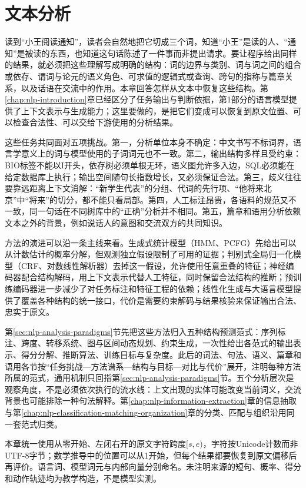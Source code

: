 \chapter{文本分析}
\label{chap:nlp-text-analysis}

读到“小王阅读通知”，读者会自然地把它切成三个词，知道“小王”是读的人、“通知”是被读的东西，也知道这句话陈述了一件事而非提出请求。要让程序给出同样的结果，就必须把这些理解写成明确的结构：词的边界与类别、词与词之间的组合或依存、谓词与论元的语义角色、可求值的逻辑式或查询、跨句的指称与篇章关系，以及话语在交流中的作用。本章回答怎样从文本中恢复这些结构。第\ref{chap:nlp-introduction}章已经区分了任务输出与判断依据，第1部分的语言模型提供了上下文表示与生成能力；这里要做的，是把它们变成可以恢复到原文位置、可以检查合法性、可以交给下游使用的分析结果。

这些任务共同面对五项挑战。第一，分析单位本身不确定：中文书写不标词界，语言学意义上的词与模型使用的子词词元也不一致。第二，输出结构多样且受约束：BIO标签不能以I开头，依存树必须单根无环，语义图允许多入边，SQL必须能在给定数据库上执行；输出空间随句长指数增长，又必须保证合法。第三，歧义往往要靠远距离上下文消解：“新学生代表”的分组、代词的先行项、“他将来北京”中“将来”的切分，都不能只看局部。第四，人工标注昂贵，各语料的规范又不一致，同一句话在不同树库中的“正确”分析并不相同。第五，篇章和语用分析依赖文本之外的背景，例如说话人的意图和交流双方的共同知识。

方法的演进可以沿一条主线来看。生成式统计模型（HMM、PCFG）先给出可以从计数估计的概率分解，但观测独立假设限制了可用的证据；判别式全局归一化模型（CRF、对数线性解析器）去掉这一假设，允许使用任意重叠的特征；神经编码器配合结构解码，用上下文表示代替人工特征，同时保留合法结构的推断；预训练编码器进一步减少了对任务标注和特征工程的依赖；线性化生成与大语言模型提供了覆盖各种结构的统一接口，代价是需要约束解码与结果核验来保证输出合法、忠实于原文。

第\ref{sec:nlp-analysis-paradigms}节先把这些方法归入五种结构预测范式：序列标注、跨度、转移系统、图与区间动态规划、约束生成，一次性给出各范式的输出表示、得分分解、推断算法、训练目标与复杂度。此后的词法、句法、语义、篇章和语用各节按“任务挑战—方法谱系—结构与目标—对比与代价”展开，注明每种方法所属的范式，通用机制只回指第\ref{sec:nlp-analysis-paradigms}节。五个分析层次是观察角度，不是必须依次执行的流水线：上文出现的实体可能改变当前词义，交流背景也可能排除一种句法解释。第\ref{chap:nlp-information-extraction}章的信息抽取与第\ref{chap:nlp-classification-matching-organization}章的分类、匹配与组织沿用同一套范式归类。

本章统一使用从零开始、左闭右开的原文字符跨度$[s,e)$，字符按Unicode计数而非UTF-8字节；数学推导中的位置可以从1开始，但每个结果都要恢复到原文偏移后再评价。语言词、模型词元与内部向量分别命名。未注明来源的短句、概率、得分和动作轨迹均为教学构造，不是模型实测。

